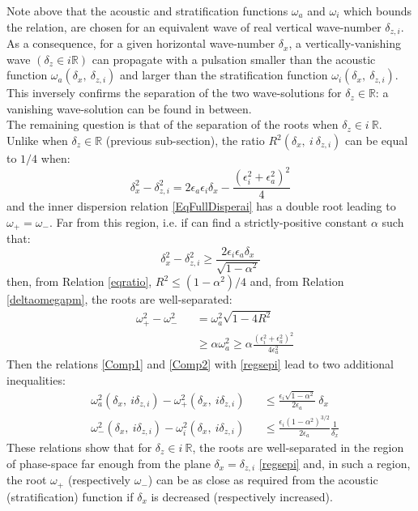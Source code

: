 \documentclass[a4paper,11pt]{article}
\begin{document}
Note above that the acoustic and stratification functions $\omega_a$ and $\omega_i$ which bounds the relation, are chosen for an equivalent wave of real vertical wave-number $\delta_{z,i}$.
As a consequence, for a given horizontal wave-number $\delta_x$, a vertically-vanishing wave $(\delta_z\in i\mathbb{R})$ can propagate with a pulsation smaller than the acoustic function $\omega_{a}(\delta_x,\ \delta_{z,i})$ and larger than the stratification function $\omega_{i}(\delta_x,\ \delta_{z,i})$. This inversely confirms the separation of the two wave-solutions for $\delta_z\in \mathbb{R}$: a vanishing wave-solution can be found in between.\\
The remaining question is that of the separation of the roots when $\delta_z\in i\ \mathbb{R}$. Unlike when $\delta_z\in \mathbb{R}$ (previous sub-section), the ratio $R^2(\delta_x,\ i\ \delta_{z,i})$ can be equal to $1/4$ when:
\begin{equation}
	\delta_x^2-\delta_{z,i}^2=2\epsilon_a\epsilon_i\delta_x 
	-\frac{(\epsilon_i^2+\epsilon_a^2)^2}{4}
\end{equation} 
and the inner dispersion relation \ref{EqFullDisperai} has a double root leading to $\omega_+ = \omega_-$.
Far from this region, i.e. if can find a strictly-positive constant $\alpha$ such that:
\begin{equation}
	\label{regsepi}
	\delta_x^2-\delta_{z,i}^2\geq
	\frac{2\epsilon_i\epsilon_a\delta_x}
	{\sqrt{1-\alpha^2}}
\end{equation}
then, from Relation \ref{eqratio}, $R^2\leq (1-\alpha^2)/4$ and, from Relation \ref{deltaomegapm}, the roots are well-separated:
\begin{subequations}
	\begin{alignat}{2}	
	&\omega_{+}^2-\omega_{-}^2 &&=\omega_a^2\sqrt{1-4 R^2}\\[3mm]
	& &&\geq \alpha\omega_a^2 
	\geq \alpha\frac{(\epsilon_i^2+\epsilon_a^2)^2}{4\epsilon_a^2}
	\end{alignat}
\end{subequations}
Then the relations \ref{Comp1} and \ref{Comp2} with \ref{regsepi} lead to two additional inequalities:
\begin{subequations}
	\begin{alignat}{2}
	\label{Comp1b}
	&\omega_a^2(\delta_x,\ i\delta_{z,i})-\omega_{+}^2(\delta_x,\ i\delta_{z,i})
	&&\leq\frac{\epsilon_i\sqrt{1-\alpha^2}}{2\epsilon_a}\ \delta_x\\[3mm]
	\label{Comp2b}
	&\omega_{-}^2(\delta_x,\ i\delta_{z,i})-\omega_i^2(\delta_x,\ i\delta_{z,i})
	&& \leq\frac{\epsilon_i (1-\alpha^2)^{3/2}}{2\epsilon_a}\frac{1}{\delta_x}
	\end{alignat}	
\end{subequations}
These relations show that for $\delta_z\in i\ \mathbb{R}$, the roots are well-separated in the region of phase-space far enough from the plane $\delta_x=\delta_{z,i}$ \ref{regsepi} and, in such a region, the root $\omega_+$ (respectively $\omega_-$) can be as close as required from the acoustic (stratification) function if $\delta_x$ is decreased (respectively increased).
\end{document}
